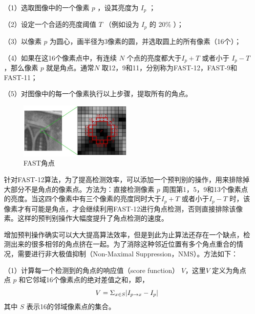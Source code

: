 （1）选取图像中的一个像素 $p$ ，设其亮度为 $I_p $ ；

（2）设定一个合适的亮度阈值 $T$ （例如设为 $I_p $ 的 20\%  ）；

（3）以像素  $p$  为圆心，画半径为3像素的圆，并选取圆上的所有像素（16个）；

（4）如果在这16个像素点中，有连续 $N $  个点的亮度都大于$I_p+T $ 或者小于 $I_p-T $，那么像素 $p $ 就是角点。通常$N $  取12，9和11，分别称为FAST-12，FAST-9和FAST-11；

（5）对图像中的每一个像素执行以上步骤，提取所有的角点。
\begin{figure}[h]\setlength{\belowcaptionskip}{-12pt}
	\centering
	\includegraphics[width=0.5\textwidth]{figures/chapter3/fig3_1}
	\caption{FAST角点}\label{fig3_1}
\end{figure}

针对FAST-12算法，为了提高检测效率，可以添加一个预判别的操作，用来排除掉大部分不是角点的像素点。方法为：直接检测像素 $p$ 周围第1，5，9和13个像素点的亮度。当这四个像素中有三个像素的亮度同时大于$I_p+T $ 或者小于$I_p-T $ 时，该像素才有可能是角点，才会继续利用FAST-12进行角点检测，否则直接排除该像素。这样的预判别操作大幅度提升了角点检测的速度。

增加预判操作确实可以大大提高算法效率，但是到此为止算法还存在一个缺点，检测出来的很多相邻的角点挤在一起。为了消除这种邻近位置有多个角点重合的情况，需要进行非大极值抑制（Non-Maximal Suppression，NMS）。方法如下：

（1）计算每一个检测到的角点的响应值（score function） $V$，这里$V$ 定义为角点点 $p$ 和它邻域16个像素点的绝对差值之和，即，
\[
\setlength{\abovedisplayskip}{6pt}
\setlength{\belowdisplayskip}{6pt}
V = \Sigma_{x \in S} |I_{p\rightarrow x} - I_p|
\] 
其中 $S$ 表示16的邻域像素点的集合。

